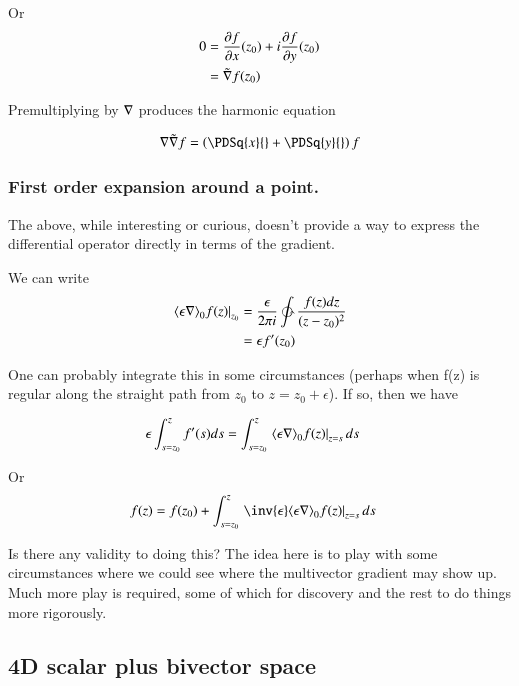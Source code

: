 Or
\begin{align*}
0 
&=
\PD{x}{f}(z_0) + i \PD{y}{f}(z_0) \\
&=
\tilde{\grad} f(z_0)
\end{align*}

Premultiplying by $\grad$ produces the harmonic equation

\begin{align*}
\grad \tilde{\grad} f = \left( \PDSq{x}{} + \PDSq{y}{} \right) f
\end{align*}

\subsubsection{First order expansion around a point. }

The above, while interesting or curious, 
doesn't provide a way to express the differential operator directly in terms of the gradient.

We can write 
\begin{align*}
\left. \gpgradezero{ \epsilon \grad } f(z) \right\vert_{z_0}
&=
\frac{\epsilon}{ 2 \pi i } \ointctrclockwise \frac{f(z) dz}{(z - z_0)^{2}} \\
&=
\epsilon f'(z_0)
\end{align*}

One can probably integrate this in some circumstances (perhaps when f(z) is regular along the straight path from $z_0$ to $z = z_0 + \epsilon$).  If so, then we have

\begin{align*}
\epsilon \int_{s=z_0}^{z} f'(s) ds &= \int_{s=z_0}^{z} \left. \gpgradezero{ \epsilon \grad } f(z) \right\vert_{z=s} ds 
\end{align*}

Or
\begin{align*}
f(z) &= f(z_0) + \int_{s=z_0}^{z} \left. \inv{\epsilon}\gpgradezero{ \epsilon \grad } f(z) \right\vert_{z=s} ds 
\end{align*}

Is there any validity to doing this?  The idea here is to play with some circumstances where we could see 
where the multivector gradient may show up.  Much more play is required, some of which for discovery and the rest
to do things more rigorously.

\subsection{4D scalar plus bivector space }

